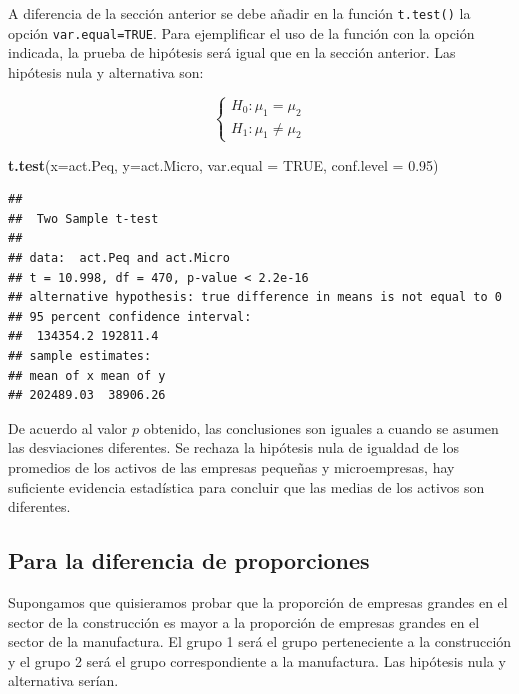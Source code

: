 \documentclass[letterpaper,]{book}
\newenvironment{Shaded}{\begin{snugshade}}{\end{snugshade}}
\newcommand{\DataTypeTok}[1]{\textcolor[rgb]{0.13,0.29,0.53}{#1}}
\newcommand{\FloatTok}[1]{\textcolor[rgb]{0.00,0.00,0.81}{#1}}
\newcommand{\KeywordTok}[1]{\textcolor[rgb]{0.13,0.29,0.53}{\textbf{#1}}}
\newcommand{\NormalTok}[1]{#1}
\newcommand{\OtherTok}[1]{\textcolor[rgb]{0.56,0.35,0.01}{#1}}
\begin{document}
A diferencia de la sección anterior se debe añadir en la función \texttt{t.test()} la opción \texttt{var.equal=TRUE}. Para ejemplificar el uso de la función con la opción indicada, la prueba de hipótesis será igual que en la sección anterior. Las hipótesis nula y alternativa son:

\begin{equation} 
\begin{cases} 
H_0: \mu_1 = \mu_2 \\ 
H_1: \mu_1 \neq \mu_2
\end{cases} 
\end{equation}

\begin{Shaded}
\begin{Highlighting}[]
\KeywordTok{t.test}\NormalTok{(}\DataTypeTok{x=}\NormalTok{act.Peq, }\DataTypeTok{y=}\NormalTok{act.Micro, }\DataTypeTok{var.equal =} \OtherTok{TRUE}\NormalTok{,}
       \DataTypeTok{conf.level =} \FloatTok{0.95}\NormalTok{)}
\end{Highlighting}
\end{Shaded}

\begin{verbatim}
## 
##  Two Sample t-test
## 
## data:  act.Peq and act.Micro
## t = 10.998, df = 470, p-value < 2.2e-16
## alternative hypothesis: true difference in means is not equal to 0
## 95 percent confidence interval:
##  134354.2 192811.4
## sample estimates:
## mean of x mean of y 
## 202489.03  38906.26
\end{verbatim}

De acuerdo al valor \(p\) obtenido, las conclusiones son iguales a cuando se asumen las desviaciones diferentes. Se rechaza la hipótesis nula de igualdad de los promedios de los activos de las empresas pequeñas y microempresas, hay suficiente evidencia estadística para concluir que las medias de los activos son diferentes.

\hypertarget{para-la-diferencia-de-proporciones}{%
\subsection{Para la diferencia de proporciones}\label{para-la-diferencia-de-proporciones}}

Supongamos que quisieramos probar que la proporción de empresas grandes en el sector de la construcción es mayor a la proporción de empresas grandes en el sector de la manufactura. El grupo 1 será el grupo perteneciente a la construcción y el grupo 2 será el grupo correspondiente a la manufactura. Las hipótesis nula y alternativa serían.
\end{document}
